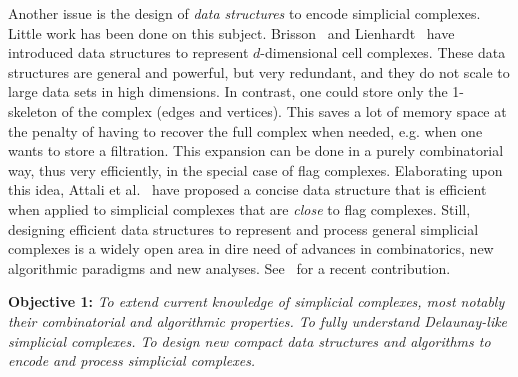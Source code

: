  
Another issue is the  design of {\em data structures } to encode simplicial complexes.
Little work has been done on this subject. Brisson~\cite{Brisson:1989:RGS:73833.73858} and
Lienhardt~\cite{DBLP:journals/ijcga/Lienhardt94} have introduced data
structures to represent $d$-dimensional cell complexes. These data
structures are general and powerful, but very redundant, and they do
not scale to large data sets in high dimensions.  In contrast, one 
could store only the 1-skeleton of the complex (edges and vertices). This 
saves a lot of memory space at the penalty of having to recover the full complex when needed, e.g. when one wants  to store a filtration. This expansion can be done in a purely combinatorial way, thus very efficiently, in the special case of flag complexes. Elaborating upon this idea, Attali et al.~\cite{Attali2011} have proposed a concise data structure that is efficient when applied to simplicial complexes that are {\em close} to flag complexes. Still, designing efficient data structures to represent and process general simplicial complexes is a widely open area in dire need of advances in combinatorics, new algorithmic paradigms and new analyses. See~\cite{bm-dssc-2012} for a recent contribution.%


\vspace{2mm}

{\bf Objective 1:} {\em 
To extend  current knowledge of simplicial complexes, most notably their combinatorial and algorithmic properties.   To fully understand Delaunay-like simplicial complexes.  To design new  compact data structures and algorithms to encode and process simplicial complexes.}


